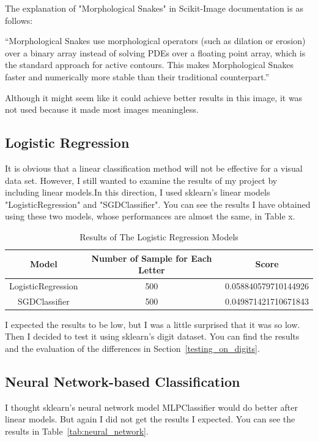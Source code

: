 \documentclass{article}
\begin{document}
\begin{flushleft}
The explanation of "Morphological Snakes" in Scikit-Image documentation is as follows:

``Morphological Snakes use morphological operators (such as dilation or erosion) over a binary array instead of solving PDEs over a floating point array, which is the standard approach for active contours. This makes Morphological Snakes faster and numerically more stable than their traditional counterpart.''

Although it might seem like it could achieve better results in this image, it was not used because it made most images meaningless.


\subsection{Logistic Regression}
It is obvious that a linear classification method will not be effective for a visual data set. However, I still wanted to examine the results of my project by including linear models.In this direction, I used sklearn's linear models "LogisticRegression" and "SGDClassifier". You can see the results I have obtained using these two models, whose performances are almost the same, in Table x.

\begin{table}[h]
    \centering
    \begin{tabular}{c|c|c}
    \hline
        Model & Number of Sample for Each Letter & Score \\
    \hline
        LogisticRegression & 500 & 0.058840579710144926 \\
        SGDClassifier & 500 & 0.049871421710671843 \\
    \hline
    \end{tabular}
    \caption{Results of The Logistic Regression Models}
    \label{tab:logistic_Regression}
\end{table}

I expected the results to be low, but I was a little surprised that it was so low. Then I decided to test it using sklearn's digit dataset. You can find the results and the evaluation of the differences in Section~\ref{testing_on_digits}.

\subsection{Neural Network-based Classification}
I thought sklearn's neural network model MLPClassifier would do better after linear models. But again I did not get the results I expected. You can see the results in Table~\ref{tab:neural_network}.


\end{flushleft}
\end{document}

